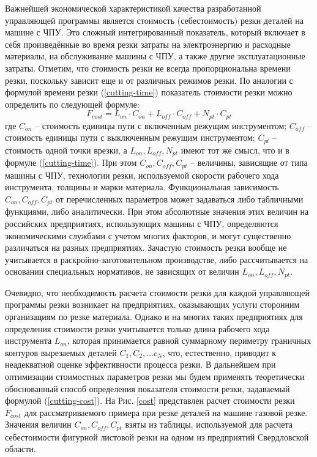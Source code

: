 \documentclass{article}
\begin{document}
Важнейшей экономической характеристикой качества
разработанной управляющей программы является стоимость
(себестоимость) резки деталей на машине с ЧПУ.
Это сложный интегрированный показатель,
который включает в себя произведённые во время
резки затраты на электроэнергию и расходные материалы,
на обслуживание машины с ЧПУ,
а также другие эксплуатационные затраты.
Отметим, что стоимость резки не всегда
пропорциональна времени резки,
поскольку зависит еще и от различных режимов резки.
По аналогии с формулой времени резки (\ref{cutting-time})
показатель стоимости резки можно определить по следующей формуле:
\begin{equation}
  F_{cost}=
  L_{on} \cdot C_{on} +
  L_{off} \cdot C_{off} +
  N_{pt} \cdot C_{pt}
  \label{cutting-cost}
\end{equation}
где
$C_{on}$ – стоимость единицы пути с включенным режущим инструментом;
$C_{off}$ – стоимость единицы пути с выключенным режущим инструментом;
$C_{pt}$ – стоимость одной точки врезки,
а $L_{on}, L_{off}, N_{pt}$
имеют тот же смысл, что и в формуле (\ref{cutting-time}).
При этом $C_{on}, C_{off}, C_{pt}$
– величины, зависящие от типа машины с ЧПУ,
технологии резки, используемой скорости рабочего хода инструмента,
толщины и марки материала.
Функциональная зависимость
$C_{on}, C_{off}, C_{pt}$
от перечисленных параметров
может задаваться либо табличными функциями,
либо аналитически.
При этом абсолютные значения этих величин
на российских предприятиях, использующих машины с ЧПУ,
определяются экономическими службами с учетом многих факторов,
и могут существенно различаться на разных предприятиях.
Зачастую стоимость резки вообще не учитывается
в раскройно-заготовительном производстве,
либо рассчитывается на основании специальных нормативов,
не зависящих от величин
$L_{on}, L_{off}, N_{pt}$.

Очевидно, что необходимость расчета стоимости резки
для каждой управляющей программы резки возникает на предприятиях,
оказывающих услуги сторонним организациям по резке материала.
Однако и на многих таких предприятиях для определения
стоимости резки учитывается только длина рабочего хода инструмента
$L_{on}$,
которая принимается равной суммарному периметру граничных контуров вырезаемых деталей
$C_1, C_2, \dots c_N$,
что, естественно, приводит к неадекватной оценке эффективности процесса резки.
В дальнейшем при оптимизации стоимостных параметров резки
мы будем применять теоретически обоснованный способ определения
показателя стоимости резки, задаваемый формулой (\ref{cutting-cost}).
На Рис. \ref{cost} представлен расчет стоимости резки
$F_{cost}$
для рассматриваемого примера при резке деталей на машине газовой резке.
Значения величин
$C_{on}, C_{off}, C_{pt}$
взяты из таблицы, используемой для расчета себестоимости фигурной
листовой резки на одном из предприятий Свердловской области.
\end{document}
